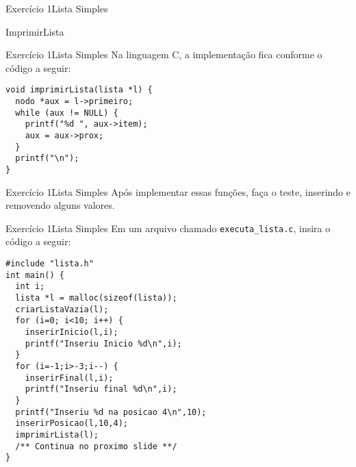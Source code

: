 \documentclass[aspectratio=169]{beamer}
\begin{document}
\begin{frame}[fragile]{Exercício 1}{Lista Simples}
\begin{algorithm}[H]
\caption{ImprimirLista} 
\label{imprimirLista}
\end{algorithm}
\end{frame}


\begin{frame}[fragile]{Exercício 1}{Lista Simples}
Na linguagem C, a implementação fica conforme o código a seguir:
\begin{lstlisting}[style=CStyle]
void imprimirLista(lista *l) {
  nodo *aux = l->primeiro;
  while (aux != NULL) {
    printf("%d ", aux->item);
    aux = aux->prox;
  }
  printf("\n");
}
\end{lstlisting}  
\end{frame}


\begin{frame}[fragile]{Exercício 1}{Lista Simples}
Após implementar essas funções, faça o teste, inserindo e removendo alguns valores.
\end{frame}


\begin{frame}[fragile]{Exercício 1}{Lista Simples}
Em um arquivo chamado \verb|executa_lista.c|, insira  o código a seguir:
\begin{lstlisting}[style=CStyle]
#include "lista.h"
int main() {
  int i;
  lista *l = malloc(sizeof(lista));
  criarListaVazia(l);
  for (i=0; i<10; i++) {
    inserirInicio(l,i);
    printf("Inseriu Inicio %d\n",i);    
  }
  for (i=-1;i>-3;i--) {
    inserirFinal(l,i);
    printf("Inseriu final %d\n",i);
  }  
  printf("Inseriu %d na posicao 4\n",10);
  inserirPosicao(l,10,4);
  imprimirLista(l);
  /** Continua no proximo slide **/
}
\end{lstlisting}  
\end{frame}
\end{document}
